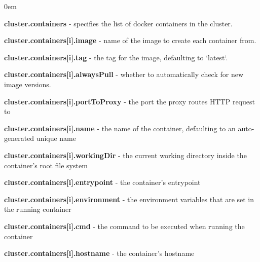\documentclass[a4paper,11pt,twoside]{report}
\begin{document}
\begin{list}{-}{}
  \itemsep0em
  \item\textbf{{cluster.containers}} - specifies the list of docker containers in the cluster.

  \item\textbf{{cluster.containers[i].image}} - name of the image to create each container from.
  \item\textbf{{cluster.containers[i].tag}} - the tag for the image, defaulting to `latest`.
  \item\textbf{{cluster.containers[i].alwaysPull}} - whether to automatically check for new image versions.
  \item\textbf{{cluster.containers[i].portToProxy}} - the port the proxy routes HTTP request to
  \item\textbf{{cluster.containers[i].name}} - the name of the container, defaulting to an auto-generated unique name
  \item\textbf{{cluster.containers[i].workingDir}} - the current working directory inside the container's root file system
  \item\textbf{{cluster.containers[i].entrypoint}} - the container's entrypoint
  \item\textbf{{cluster.containers[i].environment}} - the environment variables that are set in the running container
  \item\textbf{{cluster.containers[i].cmd}} - the command to be executed when running the container
  \item\textbf{{cluster.containers[i].hostname}} - the container's hostname


\end{list}
\end{document}
